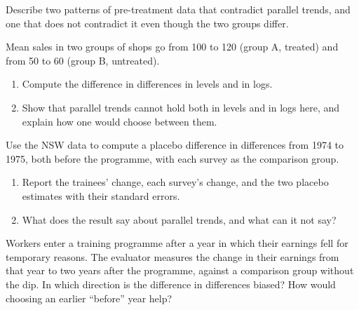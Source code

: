 \begin{exercise}[$\star$]\label{exo:b3:difference-in-differences:4}
Describe two patterns of pre-treatment data that contradict parallel trends,
and one that does not contradict it even though the two groups differ.
\end{exercise}

\begin{exercise}[$\star\star$]\label{exo:b3:difference-in-differences:5}
Mean sales in two groups of shops go from 100 to 120 (group A, treated) and from
50 to 60 (group B, untreated).
\begin{enumerate}
\item Compute the difference in differences in levels and in logs.
\item Show that parallel trends cannot hold both in levels and in logs here, and
explain how one would choose between them.
\end{enumerate}
\end{exercise}

\begin{exercise}[$\star\star$]\label{exo:b3:difference-in-differences:6}
Use the NSW data to compute a placebo difference in differences from 1974 to
1975, both before the programme, with each survey as the comparison group.
\begin{enumerate}
\item Report the trainees' change, each survey's change, and the two placebo
estimates with their standard errors.
\item What does the result say about parallel trends, and what can it not say?
\end{enumerate}
\end{exercise}

\begin{exercise}[$\star\star$]\label{exo:b3:difference-in-differences:7}
Workers enter a training programme after a year in which their earnings fell
for temporary reasons. The evaluator measures the change in their earnings from
that year to two years after the programme, against a comparison group without
the dip. In which direction is the difference in differences biased? How would
choosing an earlier ``before'' year help?
\end{exercise}

